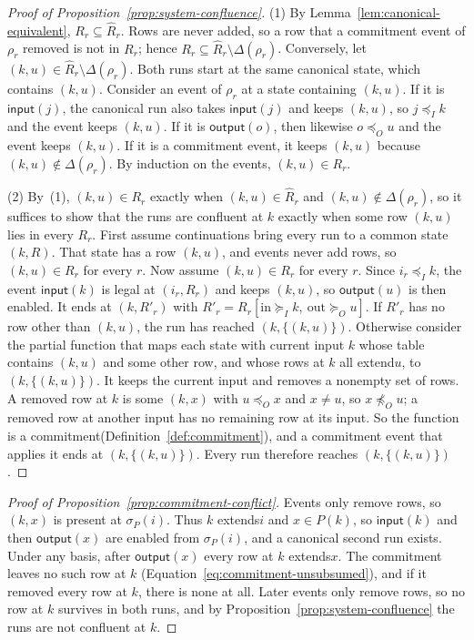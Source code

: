 \documentclass[sigconf]{cidr-2027}
\theoremstyle{remark}
\newcommand{\InputOrd}{\preceq_I}
\newcommand{\OutputOrd}{\preceq_O}
\newcommand{\InputGe}{\succeq_I}
\newcommand{\OutputGe}{\succeq_O}
\newcommand{\commitment}{commitment\xspace}
\newcommand{\inrel}{extends\xspace}          %
\newcommand{\outrel}{extends\xspace}          %
\newcommand{\outrelbase}{extend\xspace}       %
\newcommand{\fiber}[1]{P(#1)}
\begin{document}
\begin{proof}[Proof of Proposition~\ref{prop:system-confluence}]
(1) By Lemma~\ref{lem:canonical-equivalent}, $R_r\subseteq\widehat R_r$. Rows are never added, so a row that a \commitment event of $\rho_r$ removed is
not in $R_r$; hence $R_r\subseteq\widehat R_r\setminus\Delta(\rho_r)$. Conversely, let $(k,u)\in\widehat R_r\setminus\Delta(\rho_r)$. Both runs
start at the same canonical state, which contains $(k,u)$. Consider an event of
$\rho_r$ at a state containing $(k,u)$. If it is $\mathsf{input}(j)$, the
canonical run also takes $\mathsf{input}(j)$ and keeps $(k,u)$, so
$j\InputOrd k$ and the event keeps $(k,u)$. If it is $\mathsf{output}(o)$,
then likewise $o\OutputOrd u$ and the event keeps $(k,u)$. If it is a
\commitment event, it keeps $(k,u)$ because $(k,u)\notin\Delta(\rho_r)$. By
induction on the events, $(k,u)\in R_r$.

(2) By~(1), $(k,u)\in R_r$ exactly when $(k,u)\in\widehat R_r$ and
$(k,u)\notin\Delta(\rho_r)$, so it suffices to show that the runs are confluent
at $k$ exactly when some row $(k,u)$ lies in every $R_r$. First assume
continuations bring every run to a common state $(k,R)$. That state has a row
$(k,u)$, and events never add rows, so $(k,u)\in R_r$ for every $r$. Now
assume $(k,u)\in R_r$ for every $r$. Since $i_r\InputOrd k$, the event
$\mathsf{input}(k)$ is legal at $(i_r,R_r)$ and keeps $(k,u)$, so
$\mathsf{output}(u)$ is then enabled. It ends at $(k,R'_r)$ with
$R'_r=R_r[\mathrm{in}\InputGe k,\ \mathrm{out}\OutputGe u]$. If $R'_r$ has no
row other than $(k,u)$, the run has reached $(k,\{(k,u)\})$. Otherwise
consider the partial function that maps each state with current input $k$
whose table contains $(k,u)$ and some other row, and whose rows at $k$ all
\outrelbase $u$, to $(k,\{(k,u)\})$. It keeps the current input and removes a
nonempty set of rows. A removed row at $k$ is some $(k,x)$ with
$u\OutputOrd x$ and $x\neq u$, so $x\not\OutputOrd u$; a removed row at
another input has no remaining row at its input. So the function is a
\commitment (Definition~\ref{def:commitment}), and a \commitment event that
applies it ends at $(k,\{(k,u)\})$. Every run therefore reaches
$(k,\{(k,u)\})$.
\end{proof}

\begin{proof}[Proof of Proposition~\ref{prop:commitment-conflict}]
Events only remove rows, so $(k,x)$ is present at $\sigma_P(i)$. Thus $k$
\inrel $i$ and $x\in\fiber{k}$, so $\mathsf{input}(k)$ and then
$\mathsf{output}(x)$ are enabled from $\sigma_P(i)$, and a canonical second
run exists. Under any basis, after $\mathsf{output}(x)$ every row at $k$
\outrel $x$. The \commitment leaves no such row at $k$
(Equation~\ref{eq:commitment-unsubsumed}), and if it removed every row at $k$,
there is none at all. Later events only remove rows, so no row at $k$
survives in both runs, and by Proposition~\ref{prop:system-confluence} the
runs are not confluent at $k$.
\end{proof}
\end{document}
